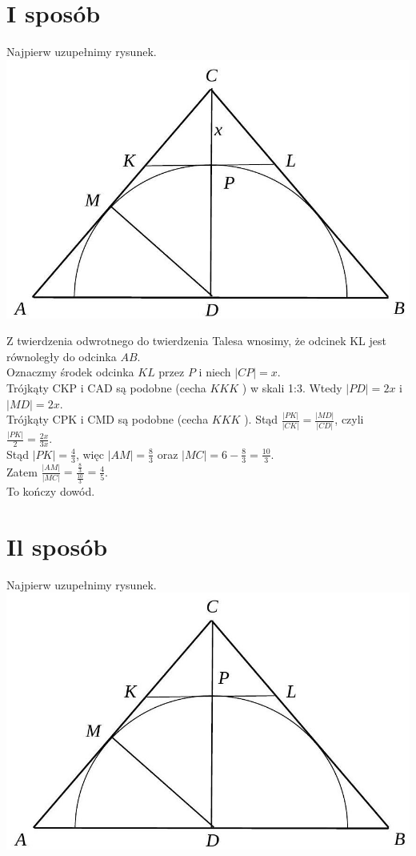 \documentclass[10pt]{article}
\begin{document}
\section*{I sposób}
Najpierw uzupełnimy rysunek.\\
\includegraphics[max width=\textwidth, center]{2025_02_07_176452ab2cb6278af830g-11(1)}

Z twierdzenia odwrotnego do twierdzenia Talesa wnosimy, że odcinek KL jest równoległy do odcinka $A B$.\\
Oznaczmy środek odcinka $K L$ przez $P$ i niech $|C P|=x$.\\
Trójkąty CKP i CAD są podobne (cecha $K K K$ ) w skali 1:3. Wtedy $|P D|=2 x$ i $|M D|=2 x$.\\
Trójkąty CPK i CMD są podobne (cecha $K K K$ ). Stąd $\frac{|P K|}{|C K|}=\frac{|M D|}{|C D|}$, czyli $\frac{|P K|}{2}=\frac{2 x}{3 x}$.\\
Stąd $|P K|=\frac{4}{3}$, więc $|A M|=\frac{8}{3}$ oraz $|M C|=6-\frac{8}{3}=\frac{10}{3}$.\\
Zatem $\frac{|A M|}{|M C|}=\frac{\frac{8}{3}}{\frac{10}{3}}=\frac{4}{5}$.\\
To kończy dowód.

\section*{Il sposób}
Najpierw uzupełnimy rysunek.\\
\includegraphics[max width=\textwidth, center]{2025_02_07_176452ab2cb6278af830g-11}
\end{document}
